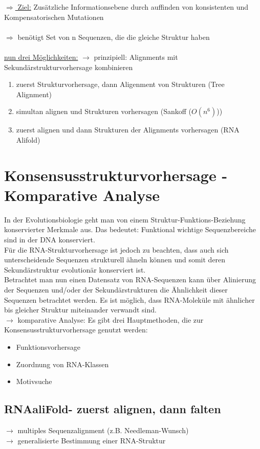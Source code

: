 \underline{$\Rightarrow$ Ziel:} Zusätzliche Informationsebene durch auffinden von konsistenten und Kompensatorischen Mutationen
\\\\
$\Rightarrow$ benötigt Set von n Sequenzen, die die gleiche Struktur haben
\\\\
\underline{nun drei Möglichkeiten:}
$\rightarrow$ prinzipiell: Alignments mit Sekundärstrukturvorhersage kombinieren
\begin{enumerate}
	\item zuerst Strukturvorhersage, dann Aligenment von Strukturen (Tree Alignment)
	\item simultan alignen und Strukturen vorhersagen (Sankoff ($O(n^6)$))
	\item zuerst alignen und dann Strukturen der Alignments vorhersagen (RNA Alifold)
\end{enumerate}

\section{Konsensusstrukturvorhersage - Komparative Analyse}

In der Evolutionsbiologie geht man von einem Struktur-Funktions-Beziehung konservierter Merkmale aus. Das bedeutet: Funktional wichtige Sequenzbereiche sind in der DNA konserviert. \\
Für die RNA-Strukturvorhersage ist jedoch zu beachten, dass auch sich unterscheidende Sequenzen strukturell ähneln können und somit deren Sekundärstruktur evolutionär konserviert ist. \\
Betrachtet man nun einen Datensatz von RNA-Sequenzen kann über Alinierung der Sequenzen und/oder der Sekundärstrukturen die Ähnlichkeit dieser Sequenzen betrachtet werden. Es ist möglich, dass RNA-Moleküle mit ähnlicher bis gleicher Struktur miteinander verwandt sind. \\
$\rightarrow$ komparative Analyse:
Es gibt drei Hauptmethoden, die zur Konsensusstrukturvorhersage genutzt werden: 
\begin{itemize}
\item Funktionsvorhersage \\
\item Zuordnung von RNA-Klassen \\
\item Motivsuche
\end{itemize}

\subsection{RNAaliFold- zuerst alignen, dann falten}
$\rightarrow$ multiples Sequenzalignment (z.B. Needleman-Wunsch) \\
$\rightarrow$ generalisierte Bestimmung einer RNA-Struktur \\

